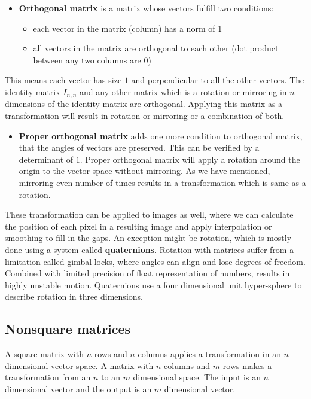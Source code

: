 \begin{itemize}
    \item \textbf{Orthogonal matrix} is a matrix whose vectors fulfill two conditions:
            \begin{itemize}
            \item each vector in the matrix (column) has a norm of 1
            \item all vectors in the matrix are orthogonal to each other (dot product between any two columns are \(0\))
        \end{itemize}
\end{itemize}

    This means each vector has size \(1\) and perpendicular to all the other vectors. The identity matrix \(I_{n,n}\) and any other matrix which is a rotation or mirroring in \(n\) dimensions of the identity matrix are orthogonal. Applying this matrix as a transformation will result in rotation or mirroring or a combination of both.

\begin{itemize}
    \item \textbf{Proper orthogonal matrix} adds one more condition to orthogonal matrix, that the angles of vectors are preserved. This can be verified by a determinant of \(1\). Proper orthogonal matrix will apply a rotation around the origin to the vector space without mirroring. As we have mentioned, mirroring even number of times results in a transformation which is same as a rotation.
\end{itemize}

These transformation can be applied to images as well, where we can calculate the position of each pixel in a resulting image and apply interpolation or smoothing to fill in the gaps. An exception might be rotation, which is mostly done using a system called \textbf{quaternions}. Rotation with matrices suffer from a limitation called gimbal locks, where angles can align and lose degrees of freedom. Combined with limited precision of float representation of numbers, results in highly unstable motion. Quaternions use a four dimensional unit hyper-sphere to describe rotation in three dimensions.

\subsection{Nonsquare matrices}

A square matrix with \(n\) rows and \(n\) columns applies a transformation in an \(n\) dimensional vector space. A matrix with \(n\) columns and \(m\) rows makes a transformation from an \(n\) to an \(m\) dimensional space. The input is an \(n\) dimensional vector and the output is an \(m\) dimensional vector.


